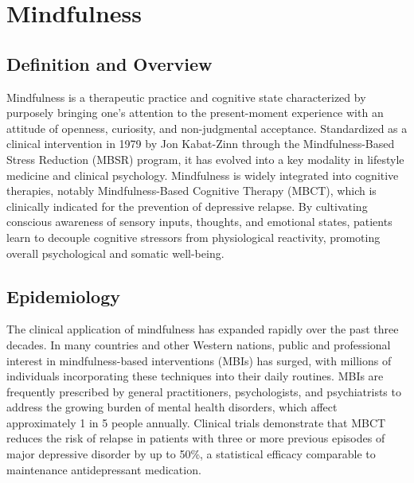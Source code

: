 \chapter{Mindfulness}

\section*{Definition and Overview}
Mindfulness is a therapeutic practice and cognitive state characterized by purposely bringing one's attention to the present-moment experience with an attitude of openness, curiosity, and non-judgmental acceptance. Standardized as a clinical intervention in 1979 by Jon Kabat-Zinn through the Mindfulness-Based Stress Reduction (MBSR) program, it has evolved into a key modality in lifestyle medicine and clinical psychology. Mindfulness is widely integrated into cognitive therapies, notably Mindfulness-Based Cognitive Therapy (MBCT), which is clinically indicated for the prevention of depressive relapse. By cultivating conscious awareness of sensory inputs, thoughts, and emotional states, patients learn to decouple cognitive stressors from physiological reactivity, promoting overall psychological and somatic well-being.

\section*{Epidemiology}
The clinical application of mindfulness has expanded rapidly over the past three decades. In many countries and other Western nations, public and professional interest in mindfulness-based interventions (MBIs) has surged, with millions of individuals incorporating these techniques into their daily routines. MBIs are frequently prescribed by general practitioners, psychologists, and psychiatrists to address the growing burden of mental health disorders, which affect approximately 1 in 5 people annually. Clinical trials demonstrate that MBCT reduces the risk of relapse in patients with three or more previous episodes of major depressive disorder by up to 50\%, a statistical efficacy comparable to maintenance antidepressant medication.

